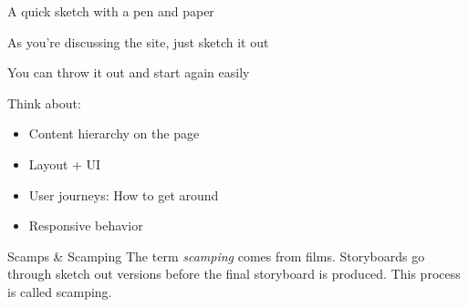 A quick sketch with a pen and paper

As you're discussing the site, just sketch it out

You can throw it out and start again easily

Think about:

\begin{itemize}
    \item Content hierarchy on the page
    \item Layout + UI
    \item User journeys: How to get around
    \item Responsive behavior
\end{itemize}

\begin{infobox}{Scamps \& Scamping}
    The term \textit{scamping} comes from films. Storyboards go through sketch out versions before the final storyboard is produced. This process is called scamping.
\end{infobox}
